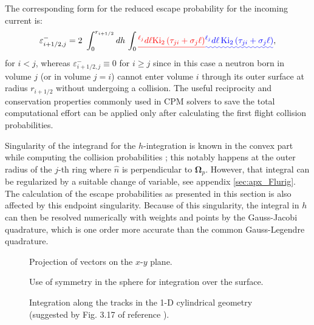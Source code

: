 \documentclass{ictt26}
\providecommand{\DIFadd}[1]{{\protect\color{blue}\uwave{#1}}} %
\providecommand{\DIFdel}[1]{{\protect\color{red}\sout{#1}}}                      %
\providecommand{\DIFaddbegin}{} %
\providecommand{\DIFaddend}{} %
\providecommand{\DIFdelbegin}{} %
\providecommand{\DIFdelend}{} %
\newcommand{\DIFscaledelfig}{0.5}
\newlength{\DIFdelgraphicswidth} %
\newlength{\DIFdelgraphicsheight} %
\newcommand{\DIFaddincludegraphics}[2][]{{\color{blue}\fbox{\DIFOincludegraphics[#1]{#2}}}} %
\newcommand{\DIFdelincludegraphics}[2][]{%
\sbox{\DIFdelgraphicsbox}{\DIFOincludegraphics[#1]{#2}}%
\settoboxwidth{\DIFdelgraphicswidth}{\DIFdelgraphicsbox} %
\settoboxtotalheight{\DIFdelgraphicsheight}{\DIFdelgraphicsbox} %
\scalebox{\DIFscaledelfig}{%
\parbox[b]{\DIFdelgraphicswidth}{\usebox{\DIFdelgraphicsbox}\\[-\baselineskip] \rule{\DIFdelgraphicswidth}{0em}}\llap{\resizebox{\DIFdelgraphicswidth}{\DIFdelgraphicsheight}{%
\setlength{\unitlength}{\DIFdelgraphicswidth}%
\begin{picture}(1,1)%
\thicklines\linethickness{2pt} %
{\color[rgb]{1,0,0}\put(0,0){\framebox(1,1){}}}%
{\color[rgb]{1,0,0}\put(0,0){\line( 1,1){1}}}%
{\color[rgb]{1,0,0}\put(0,1){\line(1,-1){1}}}%
\end{picture}%
}\hspace*{3pt}}} %
} %
\DeclareRobustCommand{\DIFaddbegin}{\DIFOaddbegin \let\includegraphics\DIFaddincludegraphics} %
\DeclareRobustCommand{\DIFaddend}{\DIFOaddend \let\includegraphics\DIFOincludegraphics} %
\DeclareRobustCommand{\DIFdelbegin}{\DIFOdelbegin \let\includegraphics\DIFdelincludegraphics} %
\DeclareRobustCommand{\DIFdelend}{\DIFOaddend \let\includegraphics\DIFOincludegraphics} %
\begin{document}
The corresponding form for the reduced escape probability for the incoming current is:
\begin{equation}
\label{eq:esc_prob_cyij-}
  \varepsilon^-_{i+1/2,j} = 2
    \displaystyle ~\int_0^{r_{i+1/2}} { dh\, %
        \int_0\DIFdelbegin \DIFdel{^{\ell_j}{
            d\ell \text{Ki}_2 \left(\tau_{ji} + \sigma_j \ell \right)
        }
	}\DIFdelend \DIFaddbegin \DIFadd{^{\ell_j}{
            d\ell \, \text{Ki}_2 \left(\tau_{ji} + \sigma_j \ell \right)
        }
	}\DIFaddend },
\end{equation}
for \DIFdelbegin \DIFdel{$i<j$}\DIFdelend \DIFaddbegin \DIFadd{$i < j$}\DIFaddend , whereas $\varepsilon^-_{i+1/2,j}\equiv 0$ for $i\geq j$ since in this case a neutron born in volume $j$ (or in volume $j=i$) cannot enter volume $i$ through its outer surface at radius $r_{i+1/2}$ without undergoing a collision. The useful reciprocity and conservation properties commonly used in CPM solvers to save the total computational effort can be applied only after calculating the first flight collision probabilities.

Singularity of the integrand for the $h$-integration \DIFaddbegin \DIFadd{introduced in Eq. \ref{eq:currp_cyl_atr} }\DIFaddend is known in the convex part while computing the collision probabilities \cite{hebert2009applied,stamm1983methods}; this notably happens at the outer radius of the $j$-th ring where $\hat{n}$ is perpendicular to $\mathbf{\Omega}_p$. However, that integral can be regularized by a suitable change of variable, see appendix \ref{sec:apx_Flurig}. The calculation of the escape probabilities as presented in this section is %
also affected by this endpoint singularity. Because of this singularity, the integral in $h$ can then be resolved numerically with weights and points by the Gauss-Jacobi quadrature, which is one order more accurate than the common Gauss-Legendre quadrature.

\begin{figure}[htbp]
  \centering
  \begin{minipage}[c]{.5\textwidth}
    \centering
    {%
    
    \caption{Projection of vectors on the $x$-$y$ plane.}
    \label{fig:fullframe}
    }%
    \vspace{3mm}
    \vfill
    {%
    
    \caption{Use of symmetry in the sphere for integration over the surface.}
    \label{fig:sphere_tracks}
    }%
\end{minipage}%
\begin{minipage}{.5\textwidth}
  \centering
    
    \caption{Integration along the tracks in the 1-D cylindrical geometry (suggested by Fig. 3.17 of reference \cite{hebert2009applied}).}
    \label{fig:cyltracks}
\end{minipage}%
\end{figure}
\end{document}
